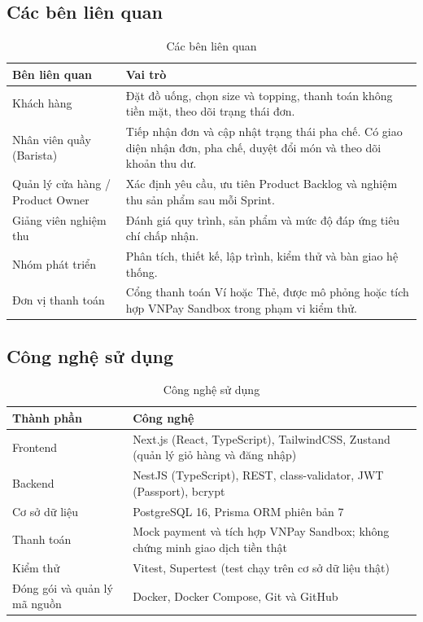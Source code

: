 \documentclass[a4paper]{article}
\begin{document}
\subsection{Các bên liên quan}
\begin{table}[h!]
\centering
\begin{tabularx}{\textwidth}{|l|X|}
\hline
\textbf{Bên liên quan} & \textbf{Vai trò} \\ \hline
Khách hàng & Đặt đồ uống, chọn size và topping, thanh toán không tiền mặt, theo dõi trạng thái đơn. \\ \hline
Nhân viên quầy (Barista) & Tiếp nhận đơn và cập nhật trạng thái pha chế. Có giao diện nhận đơn, pha chế, duyệt đổi món và theo dõi khoản thu dư. \\ \hline
Quản lý cửa hàng / Product Owner & Xác định yêu cầu, ưu tiên Product Backlog và nghiệm thu sản phẩm sau mỗi Sprint. \\ \hline
Giảng viên nghiệm thu & Đánh giá quy trình, sản phẩm và mức độ đáp ứng tiêu chí chấp nhận. \\ \hline
Nhóm phát triển & Phân tích, thiết kế, lập trình, kiểm thử và bàn giao hệ thống. \\ \hline
Đơn vị thanh toán & Cổng thanh toán Ví hoặc Thẻ, được mô phỏng hoặc tích hợp VNPay Sandbox trong phạm vi kiểm thử. \\ \hline
\end{tabularx}
\caption{Các bên liên quan}
\end{table}

\subsection{Công nghệ sử dụng}
\begin{table}[h!]
\centering
\begin{tabularx}{\textwidth}{|l|X|}
\hline
\textbf{Thành phần} & \textbf{Công nghệ} \\ \hline
Frontend & Next.js (React, TypeScript), TailwindCSS, Zustand (quản lý giỏ hàng và đăng nhập) \\ \hline
Backend & NestJS (TypeScript), REST, class-validator, JWT (Passport), bcrypt \\ \hline
Cơ sở dữ liệu & PostgreSQL 16, Prisma ORM phiên bản 7 \\ \hline
Thanh toán & Mock payment và tích hợp VNPay Sandbox; không chứng minh giao dịch tiền thật \\ \hline
Kiểm thử & Vitest, Supertest (test chạy trên cơ sở dữ liệu thật) \\ \hline
Đóng gói và quản lý mã nguồn & Docker, Docker Compose, Git và GitHub \\ \hline
\end{tabularx}
\caption{Công nghệ sử dụng}
\end{table}
\end{document}
